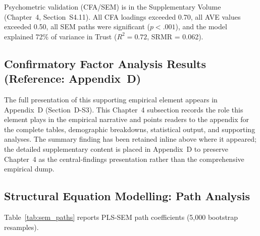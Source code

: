Psychometric validation (CFA/SEM) is in the Supplementary Volume (Chapter~4, Section~S4.11). All CFA loadings exceeded 0.70, all AVE values exceeded 0.50, all SEM paths were significant ($p < .001$), and the model explained 72\% of variance in Trust ($R^2 = 0.72$, SRMR = 0.062).

\iffalse
\subsection{Confirmatory Factor Analysis Results (Reference: Appendix~D)}

\noindent The full presentation of this supporting empirical element appears in Appendix~D (Section~D-S3). This Chapter~4 subsection records the role this element plays in the empirical narrative and points readers to the appendix for the complete tables, demographic breakdowns, statistical output, and supporting analyses. The summary finding has been retained inline above where it appeared; the detailed supplementary content is placed in Appendix~D to preserve Chapter~4 as the central-findings presentation rather than the comprehensive empirical dump.

\subsection{Structural Equation Modelling: Path Analysis}

Table~\ref{tab:sem_paths} reports PLS-SEM path coefficients (5,000 bootstrap resamples).


